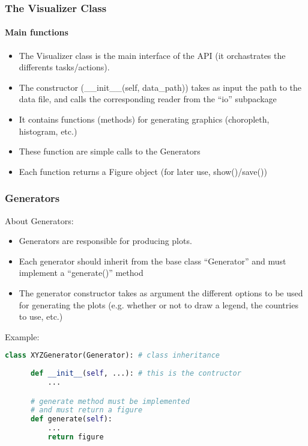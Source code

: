 \begin{frame}
  \frametitle{The Visualizer Class}
  \framesubtitle{Main functions}

  \begin{itemize}
    \item The Visualizer class is the main interface of the API (it orchastrates the differents tasks/actions).
    \item The constructor (\_\_init\_\_(self, data\_path)) takes as input 
      the path to the data file, and calls the corresponding reader from the ``io'' subpackage
    \item It contains functions (methods) for generating graphics (choropleth, histogram, etc.)
    \item These function are simple calls to the Generators
    \item Each function returns a Figure object (for later use, show()/save())
  \end{itemize}

\end{frame}

\begin{frame}[fragile,shrink=30]
  \frametitle{Generators}

  About Generators:
  \begin{itemize}
    \item Generators are responsible for producing plots.
    \item Each generator should inherit from the base class 
      ``Generator'' and must implement a ``generate()'' method
    \item The generator constructor takes as argument the different options 
      to be used for generating the plots 
      (e.g. whether or not to draw a legend, the countries to use, etc.)
  \end{itemize}

  \vspace{5mm}

  Example:
  \begin{lstlisting}[language=Python]
  class XYZGenerator(Generator): # class inheritance
      
      def __init__(self, ...): # this is the contructor
          ...

      # generate method must be implemented 
      # and must return a figure
      def generate(self): 
          ...
          return figure
  \end{lstlisting}
\end{frame}

